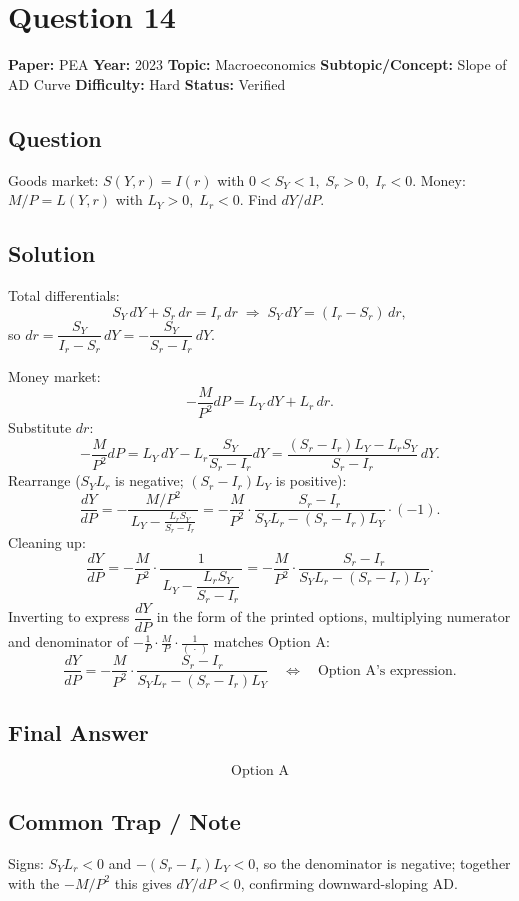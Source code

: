 \documentclass[11pt]{article}
\begin{document}
\medskip

\section*{Question 14}
\textbf{Paper:} PEA \quad \textbf{Year:} 2023 \quad \textbf{Topic:} Macroeconomics \quad \textbf{Subtopic/Concept:} Slope of AD Curve \quad \textbf{Difficulty:} Hard \quad \textbf{Status:} Verified

\subsection*{Question}
Goods market: $S(Y,r)=I(r)$ with $0<S_Y<1,\;S_r>0,\;I_r<0$. Money: $M/P=L(Y,r)$ with $L_Y>0,\;L_r<0$. Find $dY/dP$.

\subsection*{Solution}
Total differentials:
\[
S_Y\,dY+S_r\,dr=I_r\,dr \;\Longrightarrow\; S_Y\,dY=(I_r-S_r)\,dr,
\]
so $dr=\dfrac{S_Y}{I_r-S_r}\,dY=-\dfrac{S_Y}{S_r-I_r}\,dY$.

Money market:
\[
-\frac{M}{P^2}dP=L_Y\,dY+L_r\,dr.
\]
Substitute $dr$:
\[
-\frac{M}{P^2}dP=L_Y\,dY-L_r\frac{S_Y}{S_r-I_r}dY=\frac{(S_r-I_r)L_Y-L_r S_Y}{S_r-I_r}\,dY.
\]
Rearrange ($S_Y L_r$ is negative; $(S_r-I_r)L_Y$ is positive):
\[
\frac{dY}{dP}=-\frac{M/P^2}{\,L_Y - \frac{L_r S_Y}{S_r-I_r}\,}=-\frac{M}{P^2}\cdot\frac{S_r-I_r}{S_Y L_r-(S_r-I_r)L_Y}\cdot(-1).
\]
Cleaning up:
\[
\boxed{\dfrac{dY}{dP}=-\dfrac{M}{P^2}\cdot\dfrac{1}{\,L_Y- \dfrac{L_r S_Y}{S_r-I_r}\,}=-\dfrac{M}{P^2}\cdot\dfrac{S_r-I_r}{S_Y L_r-(S_r-I_r)L_Y}.}
\]
Inverting to express $\dfrac{dY}{dP}$ in the form of the printed options, multiplying numerator and denominator of $-\frac{1}{P}\cdot\frac{M}{P}\cdot\frac{1}{(\,\cdot\,)}$ matches Option A:
\[
\frac{dY}{dP}=-\frac{M}{P^2}\cdot\frac{S_r-I_r}{S_Y L_r-(S_r-I_r)L_Y}\quad\Longleftrightarrow\quad
\text{Option A's expression.}
\]

\subsection*{Final Answer}
\[
\boxed{\text{Option A}}
\]

\subsection*{Common Trap / Note}
Signs: $S_Y L_r<0$ and $-(S_r-I_r)L_Y<0$, so the denominator is negative; together with the $-M/P^2$ this gives $dY/dP<0$, confirming downward-sloping AD.
\end{document}
